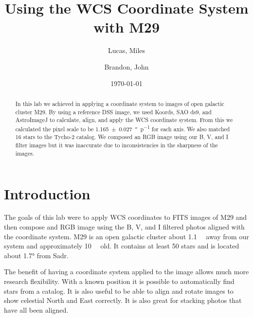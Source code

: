 \documentclass[%
aip,
jmp,
reprint,
floatfix,
nofootinbib
]{revtex4-1}
\begin{document}
	\title[WCS Coordinates with M29]{Using the WCS Coordinate System with M29}

	\author{Lucas, Miles}
	\author{Brandon, John}

	\date{\today}



	\begin{abstract}
	In this lab we achieved in applying a coordinate system to images of open galactic cluster M29. By using a reference DSS image, we used Koords, SAO ds9, and AstroImageJ to calculate, align, and apply the WCS coordinate system. From this we calculated the pixel scale to be \SI{1.165\pm.027}{\arcsecond\per p} for each axis. We also matched 16 stars to the Tycho-2 catalog. We composed an RGB image using our B, V, and I filter images but it was inaccurate due to inconsistencies in the sharpness of the images.

	\end{abstract}

	\maketitle


	\section{Introduction}

	The goals of this lab were to apply WCS coordinates to FITS images of M29 and then compose and RGB image using the B, V, and I filtered photos aligned with the coordinate system. M29 is an open galactic cluster about \SI{1.1}{\kilo\parsec} away from our system and approximately \SI{10}{\mega\year} old. It contains at least 50 stars and is located about \ang{1.7} from Sadr\citep{labman}.

	The benefit of having a coordinate system applied to the image allows much more research flexibility. With a known position it is possible to automatically find stars from a catalog. It is also useful to be able to align and rotate images to show celestial North and East correctly. It is also great for stacking photos that have all been aligned.
	
\end{document}
